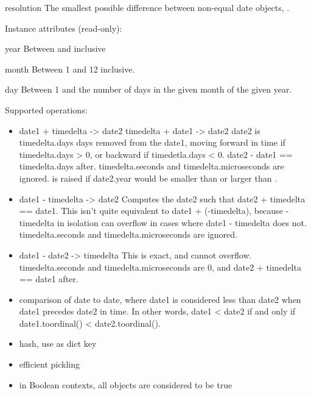 \begin{memberdesc}{resolution}
        The smallest possible difference between non-equal date
        objects, .
\end{memberdesc}

Instance attributes (read-only):

\begin{memberdesc}{year}
Between  and  inclusive
\end{memberdesc}

\begin{memberdesc}{month}
Between 1 and 12 inclusive.
\end{memberdesc}

\begin{memberdesc}{day}
Between 1 and the number of days in the given month
                    of the given year.
\end{memberdesc}

Supported operations:

\begin{itemize}
  \item
    date1 + timedelta -> date2
    timedelta + date1 -> date2
    date2 is timedelta.days days removed from the date1, moving forward
    in time if timedelta.days > 0, or backward if timedetla.days < 0.
    date2 - date1 == timedelta.days after.  timedelta.seconds and
    timedelta.microseconds are ignored.   is
    raised if date2.year would be smaller than  or
    larger than .

  \item
    date1 - timedelta -> date2
    Computes the date2 such that date2 + timedelta == date1.  This
    isn't quite equivalent to date1 + (-timedelta), because -timedelta
    in isolation can overflow in cases where date1 - timedelta does
    not.  timedelta.seconds and timedelta.microseconds are ignored.

  \item
    date1 - date2 -> timedelta
    This is exact, and cannot overflow.  timedelta.seconds and
    timedelta.microseconds are 0, and date2 + timedelta == date1
    after.

  \item
    comparison of date to date, where date1 is considered less than
    date2 when date1 precedes date2 in time.  In other words,
    date1 < date2 if and only if date1.toordinal() < date2.toordinal().

  \item
    hash, use as dict key

  \item
    efficient pickling

  \item
    in Boolean contexts, all  objects are considered to be true
\end{itemize}


